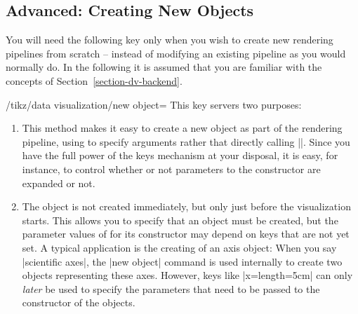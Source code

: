 \subsection{Advanced: Creating New Objects}

You will need the following key only when you wish to create new
rendering pipelines from scratch -- instead of modifying an existing
pipeline as you would normally do. In the following it is assumed that
you are familiar with the concepts of Section~\ref{section-dv-backend}.

\begin{key}{/tikz/data visualization/new object=}
  This key servers two purposes:
  \begin{enumerate}
  \item
    This method makes it easy to create a new object as part of the
    rendering pipeline, using  to specify arguments rather
    that directly calling |\pgfoonew|. Since you have the full power
    of the keys mechanism at your disposal, it is easy, for instance,
    to control whether or not parameters to the constructor are
    expanded or not.
  \item
    The object is not created immediately, but only just before the
    visualization starts. This allows you to specify that an object
    must be created, but the parameter values of for its constructor
    may depend on keys that are not yet set. A typical application is
    the creating of an axis object: When you say |scientific axes|,
    the |new object| command is used internally to create two
    objects representing these axes. However, keys like
    |x={length=5cm}| can only \emph{later} be used to specify the
    parameters that need to be passed to the constructor of the
    objects.
  \end{enumerate}


\end{key}
